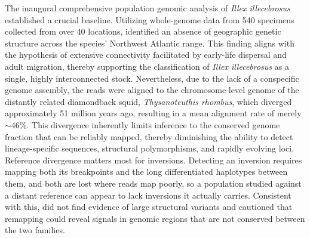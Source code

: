 \documentclass[11pt]{article}
\newcommand{\illex}{\textit{Illex illecebrosus}}
\begin{document}
The inaugural comprehensive population genomic analysis of \illex{} established a crucial baseline. Utilizing whole-genome data from 540 specimens collected from over 40 locations, \citet{baker2025} identified an absence of geographic genetic structure across the species' Northwest Atlantic range. This finding aligns with the hypothesis of extensive connectivity facilitated by early-life dispersal and adult migration, thereby supporting the classification of \illex{} as a single, highly interconnected stock. Nevertheless, due to the lack of a conspecific genome assembly, the reads were aligned to the chromosome-level genome of the distantly related diamondback squid, \textit{Thysanoteuthis rhombus}, which diverged approximately 51 million years ago, resulting in a mean alignment rate of merely $\sim$46\%. This divergence inherently limits inference to the conserved genome fraction that can be reliably mapped, thereby diminishing the ability to detect lineage-specific sequences, structural polymorphisms, and rapidly evolving loci. Reference divergence matters most for inversions. Detecting an inversion requires mapping both its breakpoints and the long differentiated haplotypes between them, and both are lost where reads map poorly, so a population studied against a distant reference can appear to lack inversions it actually carries. Consistent with this, \citet{baker2025} did not find evidence of large structural variants and cautioned that remapping could reveal signals in genomic regions that are not conserved between the two families.
\end{document}
